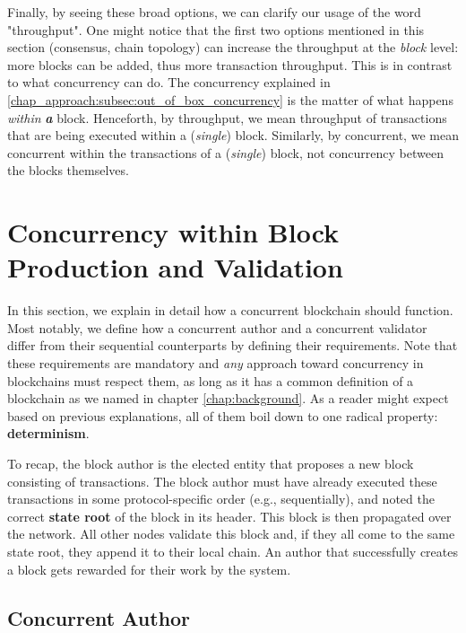 Finally, by seeing these broad options, we can clarify our usage of the word "throughput". One might
notice that the first two options mentioned in this section (consensus, chain topology) can increase
the throughput at the \textit{block} level: more blocks can be added, thus more transaction
throughput. This is in contrast to what concurrency can do. The concurrency explained in
\ref{chap_approach:subsec:out_of_box_concurrency} is the matter of what happens \textit{within}
\textit{\textbf{a}} block. Henceforth, by throughput, we mean throughput of transactions that are
being executed within a (\textit{single}) block. Similarly, by concurrent, we mean concurrent within
the transactions of a (\textit{single}) block, not concurrency between the blocks themselves.


\section{Concurrency within Block Production and Validation} \label{chap_approach:sec:concurrency}

In this section, we explain in detail how a concurrent blockchain should function. Most notably, we
define how a concurrent author and a concurrent validator differ from their sequential counterparts
by defining their requirements. Note that these requirements are mandatory and \textit{any} approach
toward concurrency in blockchains must respect them, as long as it has a common definition of a
blockchain as we named in chapter \ref{chap:background}. As a reader might expect based on previous
explanations, all of them boil down to one radical property: \textbf{determinism}.

To recap, the block author is the elected entity that proposes a new block consisting of
transactions. The block author must have already executed these transactions in some
protocol-specific order (e.g., sequentially), and noted the correct \textbf{state root} of the block
in its header. This block is then propagated over the network. All other nodes validate this block
and, if they all come to the same state root, they append it to their local chain. An author that
successfully creates a block gets rewarded for their work by the system.

\subsection{Concurrent Author} \label{chap_appraoch:subsec:concurrent_author}

